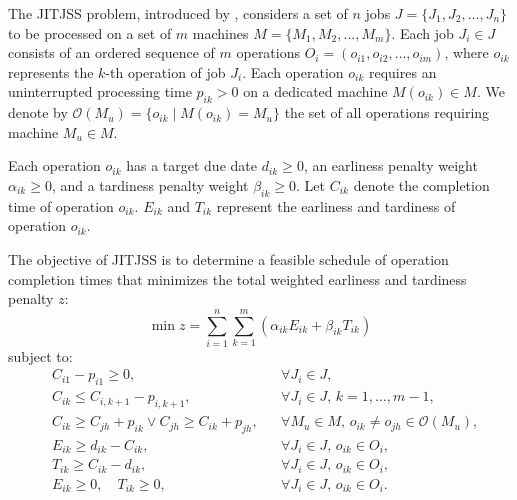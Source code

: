 The JITJSS problem, introduced by \citet{baptiste2008lagrangian}, considers a set of $n$ jobs $J = \{J_1, J_2, \ldots, J_n\}$ to be processed on a set of $m$ machines $M = \{M_1, M_2, \ldots, M_m\}$.
Each job $J_i \in J$ consists of an ordered sequence of $m$ operations $O_i = (o_{i1}, o_{i2}, \ldots, o_{im})$, where $o_{ik}$ represents the $k$-th operation of job $J_i$.
Each operation $o_{ik}$ requires an uninterrupted processing time $p_{ik} > 0$ on a dedicated machine $M(o_{ik}) \in M$.
We denote by $\mathcal{O}(M_u) = \{o_{ik} \mid M(o_{ik}) = M_u\}$ the set of all operations requiring machine $M_u \in M$.

Each operation $o_{ik}$ has a target due date $d_{ik} \ge 0$, an earliness penalty weight $\alpha_{ik} \ge 0$, and a tardiness penalty weight $\beta_{ik} \ge 0$.
Let $C_{ik}$ denote the completion time of operation $o_{ik}$. $E_{ik}$ and $T_{ik}$ represent the earliness and tardiness of operation $o_{ik}$.

The objective of JITJSS is to determine a feasible schedule of operation completion times that minimizes the total weighted earliness and tardiness penalty $z$:
\begin{equation}
\min z = \sum_{i=1}^{n} \sum_{k=1}^{m} \left( \alpha_{ik} E_{ik} + \beta_{ik} T_{ik} \right) \label{eq:obj}
\end{equation}
subject to:
\begin{align}
&C_{i1} - p_{i1}     \ge 0, && \forall J_i \in J, \label{eq:non_negative_start} \\
&C_{ik} \le C_{i,k+1} - p_{i,k+1}, && \forall J_i \in J, \, k = 1, \ldots, m-1, \label{eq:job_precedence} \\
&C_{ik} \ge C_{jh} + p_{ik} \lor C_{jh} \ge C_{ik} + p_{jh}, && \forall M_u \in M, \, o_{ik} \neq o_{jh} \in \mathcal{O}(M_u), \label{eq:machine_disjunction} \\
&E_{ik} \ge d_{ik} - C_{ik}, && \forall J_i \in J, \, o_{ik} \in O_i, \label{eq:earliness_linear} \\
&T_{ik} \ge C_{ik} - d_{ik}, && \forall J_i \in J, \, o_{ik} \in O_i, \label{eq:tardiness_linear} \\
&E_{ik} \ge 0, \quad T_{ik} \ge 0, && \forall J_i \in J, \, o_{ik} \in O_i. \label{eq:non_negativity}
\end{align}

